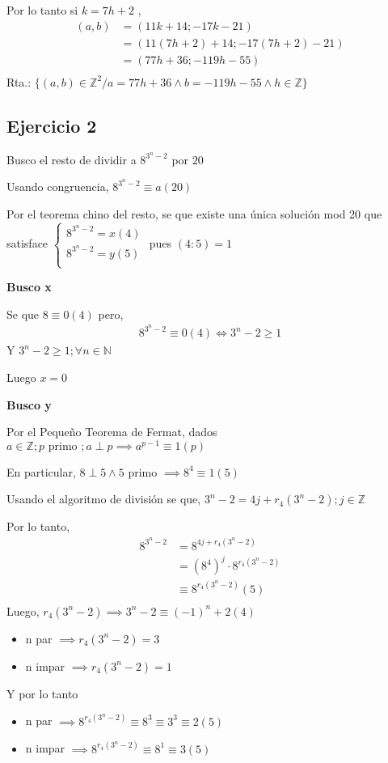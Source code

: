 Por lo tanto si $ k = 7h + 2 $ ,
\begin{align*}
    (a,b) &= (11k+14; -17k-21) \\
    &= (11(7h + 2)+14; -17(7h + 2)-21) \\
    &= (77h + 36; -119h - 55) \\
\end{align*}
Rta.: $ \{ (a,b) \in \mathbb{Z}^2 / a = 77h+36 \wedge b = -119h-55 \wedge h \in \mathbb{Z} \} $

\subsection{Ejercicio 2}

Busco el resto de dividir a $ 8^{3^n-2} $ por $20$

Usando congruencia, $ 8^{3^n-2} \equiv a (20) $

Por el teorema chino del resto, se que existe una única solución mod 20 que satisface $ \begin{cases}
    8^{3^n-2} = x (4) \\
    8^{3^n-2} = y (5) \\
\end{cases} $ pues $(4:5) = 1$

\textbf{Busco x}

Se que $ 8 \equiv 0(4) $ pero,
\begin{align*}
    8^{3^n-2} \equiv 0 (4) \iff 3^n-2 \geq 1
\end{align*}
Y $ 3^n-2 \geq 1; \forall n \in \mathbb{N} $

Luego $ x = 0 $

\textbf{Busco y}

Por el Pequeño Teorema de Fermat, dados $ a \in \mathbb{Z}; p \text{ primo }; a \perp p \implies a^{p-1} \equiv 1(p) $

En particular, $ 8\perp 5 \wedge 5 $ primo $ \implies 8^4 \equiv 1(5) $

Usando el algoritmo de división se que, $ 3^n-2 = 4j + r_4(3^n-2); j \in \mathbb{Z} $

Por lo tanto,
\begin{align*}
    8^{3^n-2} &= 8^{4j + r_4(3^n-2)} \\
    &= (8^4)^j \cdot 8^{r_4(3^n-2)} \\
    &\equiv 8^{r_4(3^n-2)} (5) \\
\end{align*}
Luego, $ r_4(3^n-2) \implies 3^n-2 \equiv (-1)^n + 2 (4) $

\begin{itemize}
    \item n par $ \implies r_4(3^n-2) = 3 $
    \item n impar $ \implies r_4(3^n-2) = 1 $
\end{itemize}
Y por lo tanto
\begin{itemize}
    \item n par $ \implies 8^{r_4(3^n-2)} \equiv 8^3 \equiv 3^3 \equiv 2 (5) $
    \item n impar $ \implies 8^{r_4(3^n-2)} \equiv 8^1 \equiv 3 (5) $
\end{itemize}

